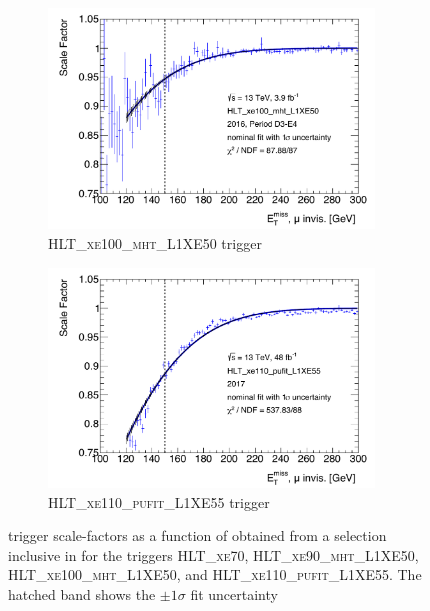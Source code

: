 \begin{figure}[htbp]
  \\
  \begin{subfigure}{0.45\textwidth}
    \centering
    \includegraphics[width=0.95\textwidth]{figures/monoH/trigger/figures_TriggerScaleFactors_SF_HLT_xe100_mht_L1XE50.pdf}
    \caption{\textsc{HLT\_xe100\_mht\_L1XE50} \met trigger}
  \end{subfigure}
    \begin{subfigure}{0.45\textwidth}
    \centering
    \includegraphics[width=0.95\textwidth]{figures/monoH/trigger/figures_TriggerScaleFactors_SF_HLT_xe110_pufit_L1XE55.pdf}
    \caption{\textsc{HLT\_xe110\_pufit\_L1XE55} \met trigger}
  \end{subfigure}
  \caption{\met trigger scale-factors as a function of \met obtained from a selection inclusive in \bjets for the \met triggers \textsc{HLT\_xe70}, \textsc{HLT\_xe90\_mht\_L1XE50}, \textsc{HLT\_xe100\_mht\_L1XE50}, and \textsc{HLT\_xe110\_pufit\_L1XE55}. The hatched band shows the \(\pm 1 \sigma\) fit uncertainty}
  \label{fig:appendix:monoH:trigger:mettriggerefficiency}
\end{figure}


